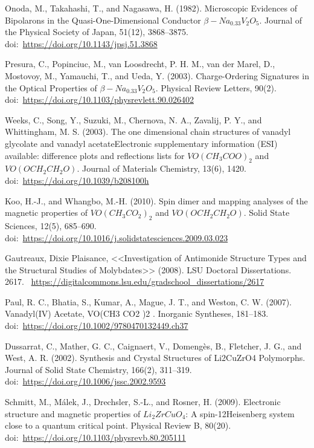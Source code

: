 \documentclass[11pt]{article}
\begin{document}
\begin{thebibliography}{3}
Onoda, M., Takahashi, T., and Nagasawa, H. (1982). Microscopic Evidences of Bipolarons in the Quasi-One-Dimensional Conductor $\beta-Na_{0.33}V_2O_5$. Journal of the Physical Society of Japan, 51(12), 3868–3875. doi:~\url{https://doi.org/10.1143/jpsj.51.3868} 

Presura, C., Popinciuc, M., van Loosdrecht, P. H. M., van der Marel, D., Mostovoy, M., Yamauchi, T., and Ueda, Y. (2003). Charge-Ordering Signatures in the Optical Properties of $\beta-Na_{0.33}V_2O_5$. Physical Review Letters, 90(2). doi:~\url{https://doi.org/10.1103/physrevlett.90.026402} 

Weeks, C., Song, Y., Suzuki, M., Chernova, N. A., Zavalij, P. Y., and Whittingham, M. S. (2003). The one dimensional chain structures of vanadyl glycolate and vanadyl acetateElectronic supplementary information (ESI) available: difference plots and reflections lists for $ VO(CH_3COO)_2 $ and $VO(OCH_2CH_2O)$. Journal of Materials Chemistry, 13(6), 1420. doi:~\url{https://doi.org/10.1039/b208100h}

Koo, H.-J., and Whangbo, M.-H. (2010). Spin dimer and mapping analyses of the magnetic properties of $VO(CH_3CO_2)_2$ and $VO(OCH_2CH_2O)$. Solid State Sciences, 12(5), 685–690. doi:~\url{https://doi.org/10.1016/j.solidstatesciences.2009.03.023} 

Gautreaux, Dixie Plaisance, <<Investigation of Antimonide Structure Types and the Structural Studies of Molybdates>> (2008). LSU Doctoral Dissertations. 2617. ~\url{https://digitalcommons.lsu.edu/gradschool_dissertations/2617}

Paul, R. C., Bhatia, S., Kumar, A., Mague, J. T., and Weston, C. W. (2007). Vanadyl(IV) Acetate, VO(CH3 CO2 )2 . Inorganic Syntheses, 181–183. doi:~\url{https://doi.org/10.1002/9780470132449.ch37} 

Dussarrat, C., Mather, G. C., Caignaert, V., Domengès, B., Fletcher, J. G., and West, A. R. (2002). Synthesis and Crystal Structures of Li2CuZrO4 Polymorphs. Journal of Solid State Chemistry, 166(2), 311–319. doi:~\url{https://doi.org/10.1006/jssc.2002.9593}

Schmitt, M., Málek, J., Drechsler, S.-L., and Rosner, H. (2009). Electronic structure and magnetic properties of $Li_2ZrCuO_4$: A spin-12Heisenberg system close to a quantum critical point. Physical Review B, 80(20). doi:~\url{https://doi.org/10.1103/physrevb.80.205111} 


\end{thebibliography}
\end{document}
